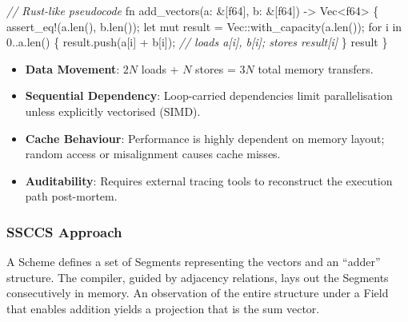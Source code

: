 \documentclass[
  a4paper,
  DIV=11,
  numbers=noendperiod]{scrartcl}
\newenvironment{Shaded}{\begin{snugshade}}{\end{snugshade}}
\newcommand{\CommentTok}[1]{\textcolor[rgb]{0.00,0.00,0.00}{\textit{#1}}}
\newcommand{\ControlFlowTok}[1]{\textcolor[rgb]{0.00,0.00,0.00}{#1}}
\newcommand{\DataTypeTok}[1]{\textcolor[rgb]{0.00,0.00,0.00}{#1}}
\newcommand{\DecValTok}[1]{\textcolor[rgb]{0.00,0.00,0.00}{#1}}
\newcommand{\KeywordTok}[1]{\textcolor[rgb]{0.00,0.00,0.00}{#1}}
\newcommand{\NormalTok}[1]{\textcolor[rgb]{0.00,0.00,0.00}{#1}}
\newcommand{\OperatorTok}[1]{\textcolor[rgb]{0.00,0.00,0.00}{#1}}
\newcommand{\PreprocessorTok}[1]{\textcolor[rgb]{0.00,0.00,0.00}{#1}}
\providecommand{\tightlist}{%
  \setlength{\itemsep}{0pt}\setlength{\parskip}{0pt}}
\begin{document}
\begin{Shaded}
\begin{Highlighting}[]
\CommentTok{// Rust{-}like pseudocode}
\KeywordTok{fn}\NormalTok{ add\_vectors(a}\OperatorTok{:} \OperatorTok{\&}\NormalTok{[}\DataTypeTok{f64}\NormalTok{]}\OperatorTok{,}\NormalTok{ b}\OperatorTok{:} \OperatorTok{\&}\NormalTok{[}\DataTypeTok{f64}\NormalTok{]) }\OperatorTok{{-}\textgreater{}} \DataTypeTok{Vec}\OperatorTok{\textless{}}\DataTypeTok{f64}\OperatorTok{\textgreater{}} \OperatorTok{\{}
    \PreprocessorTok{assert\_eq!}\NormalTok{(a}\OperatorTok{.}\NormalTok{len()}\OperatorTok{,}\NormalTok{ b}\OperatorTok{.}\NormalTok{len())}\OperatorTok{;}
    \KeywordTok{let} \KeywordTok{mut}\NormalTok{ result }\OperatorTok{=} \DataTypeTok{Vec}\PreprocessorTok{::}\NormalTok{with\_capacity(a}\OperatorTok{.}\NormalTok{len())}\OperatorTok{;}
    \ControlFlowTok{for}\NormalTok{ i }\KeywordTok{in} \DecValTok{0}\OperatorTok{..}\NormalTok{a}\OperatorTok{.}\NormalTok{len() }\OperatorTok{\{}
\NormalTok{        result}\OperatorTok{.}\NormalTok{push(a[i] }\OperatorTok{+}\NormalTok{ b[i])}\OperatorTok{;} \CommentTok{// loads a[i], b[i]; stores result[i]}
    \OperatorTok{\}}
\NormalTok{    result}
\OperatorTok{\}}
\end{Highlighting}
\end{Shaded}

\begin{itemize}
\tightlist
\item
  \textbf{Data Movement}: \(2N\) loads + \(N\) stores = \(3N\) total
  memory transfers.
\item
  \textbf{Sequential Dependency}: Loop-carried dependencies limit
  parallelisation unless explicitly vectorised (SIMD).
\item
  \textbf{Cache Behaviour}: Performance is highly dependent on memory
  layout; random access or misalignment causes cache misses.
\item
  \textbf{Auditability}: Requires external tracing tools to reconstruct
  the execution path post-mortem.
\end{itemize}

\subsubsection{SSCCS Approach}\label{ssccs-approach}

A Scheme defines a set of Segments representing the vectors and an
``adder'' structure. The compiler, guided by adjacency relations, lays
out the Segments consecutively in memory. An observation of the entire
structure under a Field that enables addition yields a projection that
is the sum vector.
\end{document}
